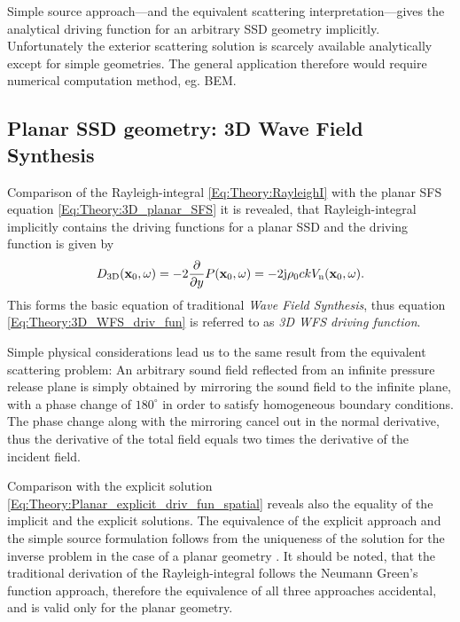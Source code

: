 Simple source approach---and the equivalent scattering interpretation---gives the analytical driving function for an arbitrary SSD geometry implicitly. Unfortunately the exterior scattering solution is scarcely available analytically except for simple geometries. The general application therefore would require numerical computation method, eg. BEM. %

\subsection{Planar SSD geometry: 3D Wave Field Synthesis}

Comparison of the Rayleigh-integral \eqref{Eq:Theory:RayleighI} with the planar SFS equation \eqref{Eq:Theory:3D_planar_SFS} it is revealed, that Rayleigh-integral implicitly contains the driving functions for a planar SSD and the driving function is given by
\begin{equation}
D_{\mathrm{3D}}(\mathbf{x}_0,\omega) = -2\frac{\partial}{\partial y} P(\mathbf{x}_0,\omega) = - 2 \mathrm{j} \rho_0 c k V_{\mathrm{n}}(\mathbf{x}_0,\omega).
\label{Eq:Theory:3D_WFS_driv_fun}
\end{equation}
This forms the basic equation of traditional \emph{Wave Field Synthesis}, thus equation \eqref{Eq:Theory:3D_WFS_driv_fun} is referred to as \emph{3D WFS driving function}.

Simple physical considerations lead us to the same result from the equivalent scattering problem:
An arbitrary sound field reflected from an infinite pressure release plane is simply obtained by mirroring the sound field to the infinite plane, with a phase change of $180^{\circ}$ in order to satisfy homogeneous boundary conditions. The phase change along with the mirroring cancel out in the normal derivative, thus the derivative of the total field equals two times the derivative of the incident field.

Comparison with the explicit solution \eqref{Eq:Theory:Planar_explicit_driv_fun_spatial} reveals also the equality of the implicit and the explicit solutions.
The equivalence of the explicit approach and the simple source formulation follows from the uniqueness of the solution for the inverse problem in the case of a planar geometry \cite{Fazi2010}.
It should be noted, that the traditional derivation of the Rayleigh-integral follows the Neumann Green's function approach, therefore the equivalence of all three approaches accidental, and is valid only for the planar geometry.

